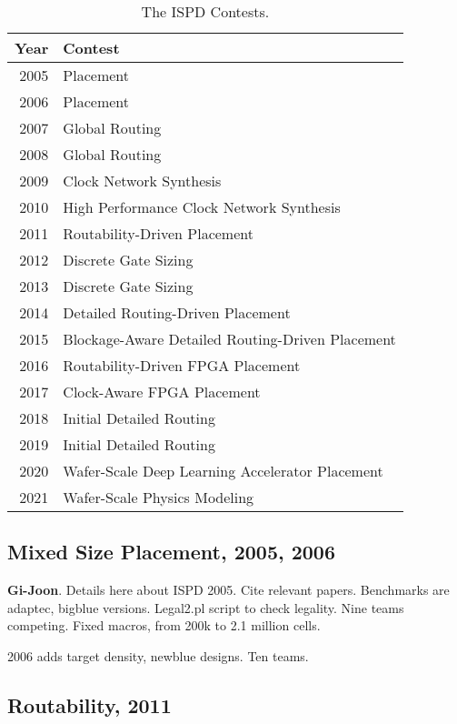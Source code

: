 \documentclass[sigconf]{acmart}
\begin{document}
\begin{table}
  \begin{tabular}{|r|l|}\hline
    Year & Contest \\ \hline
    2005 & Placement \\ \hline
    2006 & Placement \\ \hline    
    2007 & Global Routing \\ \hline
    2008 & Global Routing \\ \hline
    2009 & Clock Network Synthesis \\ \hline    
    2010 & High Performance Clock Network Synthesis \\ \hline    
    2011 & Routability-Driven Placement \\ \hline
    2012 & Discrete Gate Sizing \\ \hline
    2013 & Discrete Gate Sizing \\ \hline    
    2014 & Detailed Routing-Driven Placement \\ \hline    
    2015 & Blockage-Aware Detailed Routing-Driven Placement \\ \hline
    2016 & Routability-Driven FPGA Placement \\ \hline
    2017 & Clock-Aware FPGA Placement \\ \hline    
    2018 & Initial Detailed Routing \\ \hline    
    2019 & Initial Detailed Routing \\ \hline
    2020 & Wafer-Scale Deep Learning Accelerator Placement \\ \hline
    2021 & Wafer-Scale Physics Modeling \\ \hline
  \end{tabular}
  \caption{The ISPD Contests.}
  \label{tab:ispdcontest}
\end{table}

\subsection{Mixed Size Placement, 2005, 2006}

{\bf Gi-Joon}.  
\cite{ISPD05_contest}
Details here about ISPD 2005.  Cite relevant papers.
Benchmarks are adaptec, bigblue versions.  Legal2.pl script to
check legality.  Nine teams competing.
Fixed macros, from 200k to 2.1 million cells.

2006 adds target density, newblue designs.  Ten teams.  

\subsection{Routability, 2011}
\end{document}

